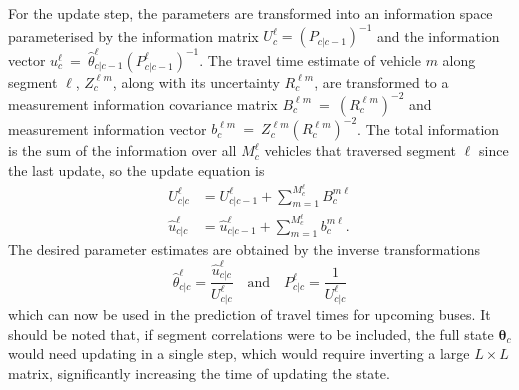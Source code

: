 For the update step, the parameters are transformed into an information
space parameterised by the information matrix $U^\ell_c = (P_{c|c-1})^{-1}$
and the information vector $u^\ell_c~=~\hat \theta^\ell_{c|c-1} (P^\ell_{c|c-1})^{-1}$.
The travel time estimate of vehicle $m$ along segment $\ell$,
$Z_c^{\ell m}$, along with its uncertainty $R^{\ell m}_c$,
are transformed to a measurement information covariance matrix 
$B_c^{\ell m}~=~(R^{\ell m}_c)^{-2}$
and measurement information vector $b_c^{\ell m}~=~Z^{\ell m}_c (R^{\ell m}_c)^{-2}$.
The total information is the sum of the information over all $M_c^\ell$ vehicles
that traversed segment $\ell$ since the last update,
so the update equation is
\begin{align*}
U^\ell_{c|c} &= U^\ell_{c|c-1} + \sum_{m=1}^{M_c^\ell} B^{m\ell}_{c} \\
\hat u^\ell_{c|c} &= \hat u^\ell_{c|c-1} + \sum_{m=1}^{M_c^\ell} b^{m\ell}_{c}.
\end{align*}
The desired parameter estimates are obtained 
by the inverse transformations
\begin{equation*}
\hat \theta^\ell_{c|c} = \frac{\hat u^\ell_{c|c}}{U^\ell_{c|c}} 
\quad\text{and}\quad
P^\ell_{c|c} = \frac{1}{U^\ell_{c|c}}
\end{equation*}
which can now be used in the prediction of travel times
for upcoming buses. 
It should be noted that, if segment correlations were to be included,
the full state $\boldsymbol{\theta}_c$ would need updating in a single step,
which would require inverting a large $L\times L$ matrix,
significantly increasing the time of updating the state.



